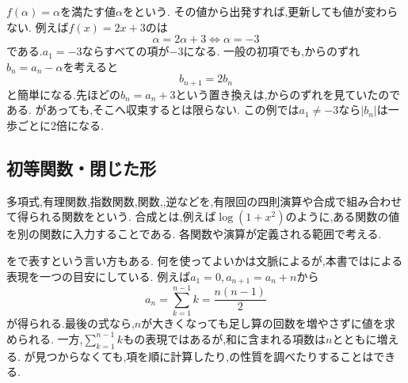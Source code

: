     $f(\alpha)=\alpha$を満たす値$\alpha$を\textbf{}という.
    その値から出発すれば,更新しても値が変わらない.
    例えば$f(x)=2x+3$のは
    \[
      \alpha=2\alpha+3\iff\alpha=-3
    \]
    である.$a_1=-3$ならすべての項が$-3$になる.
    一般の初項でも,からのずれ$b_n=a_n-\alpha$を考えると
    \[
      b_{n+1}=2b_n
    \]
    と簡単になる.先ほどの$b_n=a_n+3$という置き換えは,からのずれを見ていたのである.
    があっても,そこへ収束するとは限らない.
    この例では$a_1\ne-3$なら$|b_n|$は一歩ごとに2倍になる.

  \subsection{初等関数・閉じた形}\label{節：初等関数・閉じた形}
    多項式,有理関数,指数関数,関数,,逆などを,有限回の四則演算や合成で組み合わせて得られる関数を\textbf{}という.
    合成とは,例えば$\log(1+x^2)$のように,ある関数の値を別の関数に入力することである.
    各関数や演算が定義される範囲で考える.

    を\textbf{}で表すという言い方もある.
    何を使ってよいかは文脈によるが,本書ではによる表現を一つの目安にしている.
    例えば$a_1=0$,\,$a_{n+1}=a_n+n$から
    \[
      a_n=\sum_{k=1}^{n-1}k=\frac{n(n-1)}{2}
    \]
    が得られる.最後の式なら,$n$が大きくなっても足し算の回数を増やさずに値を求められる.
    一方,$\sum_{k=1}^{n-1}k$もの表現ではあるが,和に含まれる項数は$n$とともに増える.
    が見つからなくても,項を順に計算したり,の性質を調べたりすることはできる.
